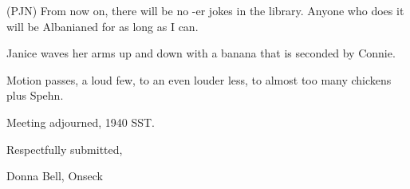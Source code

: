 \documentclass[12pt]{article}
\begin{document}
(PJN) From now on, there will be no -er jokes in the library.  Anyone who does it will be Albanianed for as long as I can.

Janice waves her arms up and down with a banana that is seconded by Connie.

Motion passes, a loud few, to an even louder less, to almost too many chickens plus Spehn.

\vspace{12pt}

\noindent
Meeting adjourned, 1940 SST.

\vspace{18pt}

\centerline{Respectfully submitted,}
\centerline{Donna Bell, Onseck}
\end{document}

